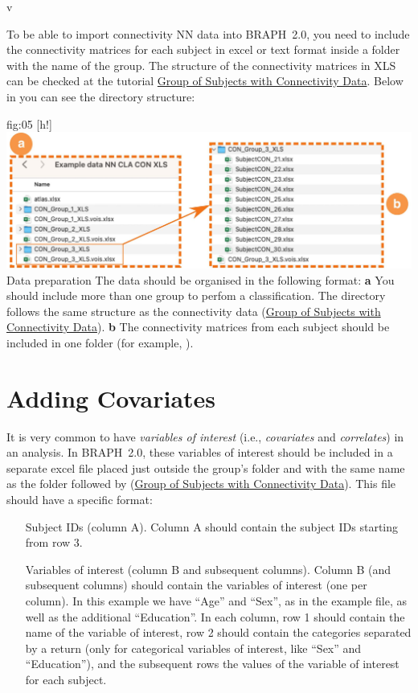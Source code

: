 v\documentclass[justified]{tufte-handout}
\begin{document}
To be able to import connectivity NN data into BRAPH~2.0, you need to include the connectivity matrices for each subject in excel or text format inside a folder with the name of the group. The structure of the connectivity matrices in XLS can be checked at the tutorial \href{https://github.com/braph-software/BRAPH-2/tree/develop/tutorials/general/tut_gr_con}{Group of Subjects with Connectivity Data}. Below in  you can see the directory structure:

	{fig:05}
	{
	[h!]
	\includegraphics{fig05.jpg}
	}
	{Data preparation}
	{
	The data should be organised in the following format:
	{\bf a} You should include more than one group to perfom a classification. The directory follows the same structure as the connectivity data (\href{https://github.com/braph-software/BRAPH-2/tree/develop/tutorials/general/tut_gr_con}{Group of Subjects with Connectivity Data}). 
	{\bf b} The connectivity matrices from each subject should be included in one folder (for example, ). 
	} 

\section{Adding Covariates}

It is very common to have \emph{variables of interest} (i.e., \emph{covariates} and \emph{correlates}) in an analysis. In BRAPH~2.0, these variables of interest should be included in a separate excel file placed just outside the group's folder and with the same name as the folder followed by  (\href{https://github.com/braph-software/BRAPH-2/tree/develop/tutorials/general/tut_gr_con}{Group of Subjects with Connectivity Data}).
This file should have a specific format:
\begin{itemize}

\item[Subject IDs (column A).]
Column A should contain the subject IDs starting from row 3.

\item[Variables of interest (column B and subsequent columns).]
Column B (and subsequent columns) should contain the variables of interest (one per column). 
In this example we have ``Age'' and ``Sex'', as in the example file, as well as the additional ``Education''.
In each column, row 1 should contain the name of the variable of interest, row 2 should contain the categories separated by a return (only for categorical variables of interest, like ``Sex'' and ``Education''), and the subsequent rows the values of the variable of interest for each subject.

\end{itemize}	
\end{document}
